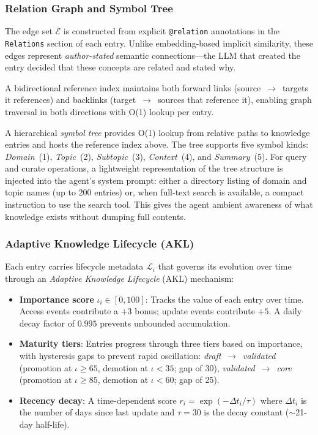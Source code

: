 \documentclass[11pt]{article}
\begin{document}
\subsubsection{Relation Graph and Symbol Tree}

The edge set $\mathcal{E}$ is constructed from explicit \texttt{@relation} annotations
in the \texttt{Relations} section of each entry.
Unlike embedding-based implicit similarity, these edges represent
\emph{author-stated} semantic connections---the LLM that created the entry
decided that these concepts are related and stated why.

A bidirectional reference index maintains both forward links
(source~$\to$~targets it references) and backlinks (target~$\to$~sources that reference it),
enabling graph traversal in both directions with O(1) lookup per entry.

A hierarchical \emph{symbol tree} provides O(1) lookup from relative paths to knowledge entries
and hosts the reference index above.
The tree supports five symbol kinds:
\emph{Domain}~(1), \emph{Topic}~(2), \emph{Subtopic}~(3), \emph{Context}~(4), and \emph{Summary}~(5).
For query and curate operations, a lightweight representation of the tree structure
is injected into the agent's system prompt: either a directory listing of domain
and topic names (up to 200 entries) or, when full-text search is available,
a compact instruction to use the search tool.
This gives the agent ambient awareness of what knowledge exists
without dumping full contents.

\subsubsection{Adaptive Knowledge Lifecycle (AKL)}

Each entry carries lifecycle metadata $\mathcal{L}_i$ that governs its evolution over time
through an \emph{Adaptive Knowledge Lifecycle} (AKL) mechanism:

\begin{itemize}[leftmargin=*]
  \item \textbf{Importance score} $\iota_i \in [0, 100]$:
    Tracks the value of each entry over time.
    Access events contribute a $+3$ bonus; update events contribute $+5$.
    A daily decay factor of $0.995$ prevents unbounded accumulation.

  \item \textbf{Maturity tiers}:
    Entries progress through three tiers based on importance,
    with hysteresis gaps to prevent rapid oscillation:
    \emph{draft}~$\to$~\emph{validated} (promotion at $\iota \geq 65$, demotion at $\iota < 35$; gap of 30),
    \emph{validated}~$\to$~\emph{core} (promotion at $\iota \geq 85$, demotion at $\iota < 60$; gap of 25).

  \item \textbf{Recency decay}:
    A time-dependent score $r_i = \exp(-\Delta t_i / \tau)$
    where $\Delta t_i$ is the number of days since last update
    and $\tau = 30$ is the decay constant ($\sim$21-day half-life).
\end{itemize}
\end{document}
